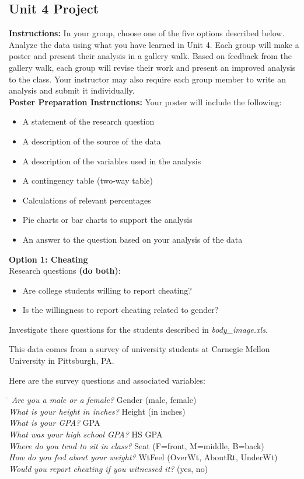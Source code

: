 \subsection{Unit 4 Project}
\textbf{Instructions:} In your group, choose one of the five options described below. Analyze the data using what you have learned in Unit 4. Each group will make a poster and present their analysis in a gallery walk. Based on feedback from the gallery walk, each group will revise their work and present an improved analysis to the class. Your instructor may also require each group member to write an analysis and submit it individually.\\ 


\textbf{Poster Preparation Instructions:} Your poster will include the following: 
\begin{itemize}
\item A statement of the research question 
\item A description of the source of the data 
\item A description of the variables used in the analysis 
\item A contingency table (two-way table)
\item Calculations of relevant percentages
\item Pie charts or bar charts to support the analysis
\item An answer to the question based on your analysis of the data
\end{itemize}

\textbf{Option 1: Cheating}\\
Research questions \textbf{(do both)}:
\begin{itemize}
\item Are college students willing to report cheating?
\item Is the willingness to report cheating related to gender?
\end{itemize}

Investigate these questions for the students described in \emph{body\_image.xls}. 

This data comes from a survey of university students at Carnegie Mellon University in Pittsburgh, PA.

Here are the survey questions and associated variables: 
\begin{tabbing}
\hspace*{3in}\=\kill
\emph{Are you a male or a female?}\> Gender (male, female)\\
\emph{What is your height in inches?}\> Height (in inches)\\
\emph{What is your GPA?}\> GPA\\
\emph{What was your high school GPA?}\> HS GPA\\
\emph{Where do you tend to sit in class?}\> Seat (F=front, M=middle, B=back)\\
\emph{How do you feel about your weight?}\> WtFeel (OverWt, AboutRt, UnderWt)\\
\emph{Would you report cheating if you witnessed it?}\> (yes, no)
\end{tabbing}

